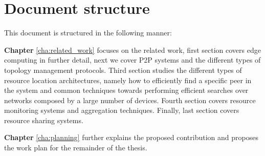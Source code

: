 \section{Document structure}

This document is structured in the following manner:

\textbf{Chapter} \ref{cha:related_work} focuses on the related work, first section covers edge computing in further detail, next we cover P2P systems and the different types of topology management protocols. Third section studies the different types of resource location architectures, namely how to efficiently find a specific peer in the system and common techniques towards performing efficient searches over networks composed by a large number of devices. Fourth section covers resource monitoring systems and aggregation techniques. Finally, last section covers resource sharing systems.

\textbf{Chapter} \ref{cha:planning} further explains the proposed contribution and proposes the work plan for the remainder of the thesis. 

